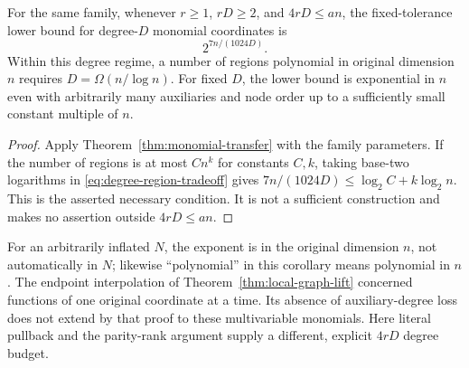 \begin{corollary}\label{cor:degree-regions}
For the same family, whenever $r\ge1$, $rD\ge2$, and $4rD\le an$,
the fixed-tolerance lower bound for degree-$D$ monomial coordinates is
\begin{equation}\label{eq:degree-region-tradeoff}
 2^{7n/(1024D)}.
\end{equation}
Within this degree regime, a number of regions polynomial in original
dimension $n$ requires $D=\Omega(n/\log n)$. For fixed $D$, the lower
bound is exponential in $n$ even with arbitrarily many auxiliaries and
node order up to a sufficiently small constant multiple of $n$.
\end{corollary}
\begin{proof}
Apply Theorem~\ref{thm:monomial-transfer} with the family parameters. If
the number of regions is at most $Cn^k$ for constants $C,k$, taking
base-two logarithms in \eqref{eq:degree-region-tradeoff} gives
$7n/(1024D)\le\log_2 C+k\log_2 n$. This is the asserted necessary
condition. It is not a sufficient construction and makes no assertion
outside $4rD\le an$.
\end{proof}
For an arbitrarily inflated $N$, the exponent is in the original dimension
$n$, not automatically in $N$; likewise ``polynomial'' in this corollary
means polynomial in $n$. The endpoint interpolation of
Theorem~\ref{thm:local-graph-lift} concerned functions of one original
coordinate at a time. Its absence of auxiliary-degree loss does not
extend by that proof to these multivariable monomials. Here literal
pullback and the parity-rank argument supply a different, explicit
$4rD$ degree budget.
